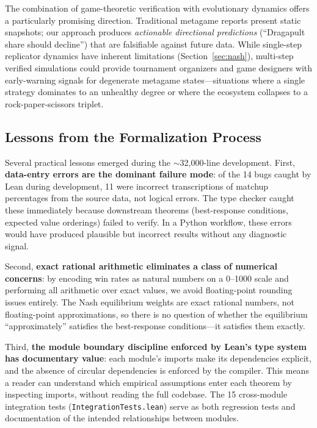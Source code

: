 \documentclass[journal]{IEEEtran}
\let\origsubsection\subsection
\renewcommand{\subsection}{\needspace{3\baselineskip}\origsubsection}
\begin{document}
The combination of game-theoretic verification with evolutionary dynamics offers a particularly promising direction.
Traditional metagame reports present static snapshots; our approach produces \emph{actionable directional predictions} (``Dragapult share should decline'') that are falsifiable against future data.
While single-step replicator dynamics have inherent limitations (Section~\ref{sec:nash}), multi-step verified simulations could provide tournament organizers and game designers with early-warning signals for degenerate metagame states---situations where a single strategy dominates to an unhealthy degree or where the ecosystem collapses to a rock-paper-scissors triplet.

\subsection{Lessons from the Formalization Process}

Several practical lessons emerged during the ${\sim}$32{,}000-line development.
First, \textbf{data-entry errors are the dominant failure mode}: of the 14 bugs caught by Lean during development, 11 were incorrect transcriptions of matchup percentages from the source data, not logical errors.
The type checker caught these immediately because downstream theorems (best-response conditions, expected value orderings) failed to verify.
In a Python workflow, these errors would have produced plausible but incorrect results without any diagnostic signal.

Second, \textbf{exact rational arithmetic eliminates a class of numerical concerns}: by encoding win rates as natural numbers on a 0--1000 scale and performing all arithmetic over exact values, we avoid floating-point rounding issues entirely.
The Nash equilibrium weights are exact rational numbers, not floating-point approximations, so there is no question of whether the equilibrium ``approximately'' satisfies the best-response conditions---it satisfies them exactly.

Third, \textbf{the module boundary discipline enforced by Lean's type system has documentary value}: each module's imports make its dependencies explicit, and the absence of circular dependencies is enforced by the compiler.
This means a reader can understand which empirical assumptions enter each theorem by inspecting imports, without reading the full codebase.
The 15 cross-module integration tests (\texttt{IntegrationTests.lean}) serve as both regression tests and documentation of the intended relationships between modules.
\end{document}
